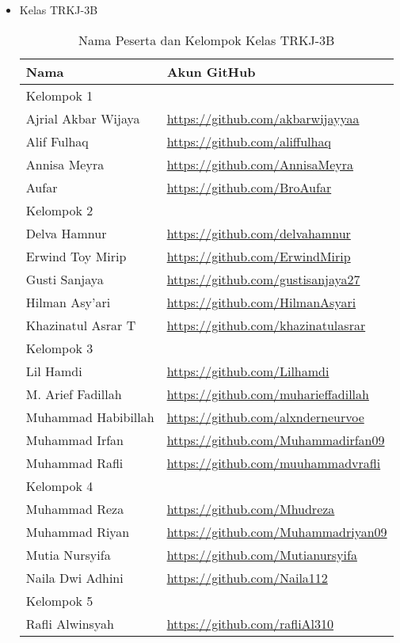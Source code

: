 \documentclass[a4paper]{tufte-handout}
\begin{document}
\begin{projects}
\begin{description}
\begin{itemize}
\vspace*{3mm}
\item Kelas TRKJ-3B
\begin{table}[!ht]
\caption{Nama Peserta dan Kelompok Kelas TRKJ-3B}
\label{tab:peserta}
\centering
\begin{tabular}{ll} 
\toprule
Nama &	Akun GitHub\\
\midrule
Kelompok 1\\
\midrule
Ajrial Akbar Wijaya		& \url{https://github.com/akbarwijayyaa} \\
Alif Fulhaq 			& \url{https://github.com/aliffulhaq} \\
Annisa Meyra			& \url{https://github.com/AnnisaMeyra} \\
Aufar					& \url{https://github.com/BroAufar} \\
\midrule
Kelompok 2\\
\midrule
Delva Hamnur			& \url{https://github.com/delvahamnur} \\
Erwind Toy Mirip		& \url{https://github.com/ErwindMirip} \\
Gusti Sanjaya			& \url{https://github.com/gustisanjaya27} \\
Hilman Asy'ari			& \url{https://github.com/HilmanAsyari} \\
Khazinatul Asrar T		& \url{https://github.com/khazinatulasrar} \\
\midrule
Kelompok 3\\
\midrule
Lil Hamdi				& \url{https://github.com/Lilhamdi} \\
M. Arief Fadillah		& \url{https://github.com/muharieffadillah} \\
Muhammad Habibillah		& \url{https://github.com/alxnderneurvoe} \\
Muhammad Irfan			& \url{https://github.com/Muhammadirfan09} \\
Muhammad Rafli			& \url{https://github.com/muuhammadvrafli} \\
\midrule
Kelompok 4\\
\midrule
Muhammad Reza			& \url{https://github.com/Mhudreza} \\
Muhammad Riyan			& \url{https://github.com/Muhammadriyan09} \\
Mutia Nursyifa			& \url{https://github.com/Mutianursyifa} \\
Naila Dwi Adhini		& \url{https://github.com/Naila112} \\
\midrule
Kelompok 5\\
\midrule
Rafli Alwinsyah			& \url{https://github.com/rafliAl310} \\

\end{tabular}
\end{table}
\end{itemize}
\end{description}
\end{projects}
\end{document}
